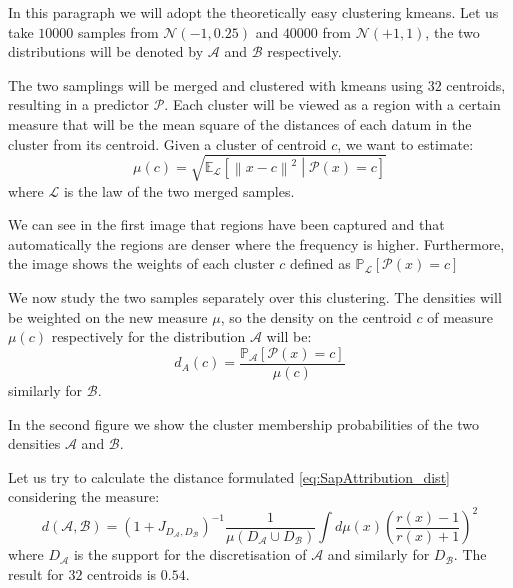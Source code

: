 \begin{toReview}
\begin{exempli_gratia}
	In this paragraph we will adopt the theoretically easy clustering \gls{kmeans}. Let us take $\num{10000}$ samples from $\mathcal{N}(-1,0.25)$ and $\num{40000}$ from $\mathcal{N}(+1,1)$, the two distributions will be denoted by $\mathcal{A}$ and $\mathcal{B}$ respectively.

	\noindent The two samplings will be merged and clustered with \gls{kmeans} using $32$ centroids, resulting in a predictor $\mathcal{P}$. Each cluster will be viewed as a region with a certain measure that will be the mean square of the distances of each datum in the cluster from its centroid. Given a cluster of centroid $c$, we want to estimate:
	\[
	\mu(c)=\sqrt{\mathbb{E}_\mathcal{L}\left[\left\|x-c\right\|^2\middle|\mathcal{P}\left(x\right)=c\right]}
	\]
	where $\mathcal{L}$ is the law of the two merged samples.

	\noindent We can see in the first image that regions have been captured and that automatically the regions are denser where the frequency is higher. Furthermore, the image shows the weights of each cluster $c$ defined as  $\mathbb{P}_\mathcal{L}\left[\mathcal{P}(x)=c\right]$

	\noindent We now study the two samples separately over this clustering. The densities will be weighted on the new measure $\mu$, so the density on the centroid $c$ of measure $\mu(c)$ respectively for the distribution $\mathcal{A}$ will be:
	\[
	d_A(c)=\frac{\mathbb{P}_{\mathcal{A}}\left[\mathcal{P}(x)=c\right]}{\mu(c)}
	\]
	similarly for $\mathcal{B}$.

	\noindent In the second figure we show the cluster membership probabilities of the two densities $\mathcal{A}$ and $\mathcal{B}$.

	\noindent Let us try to calculate the distance formulated \cref{eq:SapAttribution_dist} considering the measure:
	\[
	d(\mathcal{A},\mathcal{B})=(1+J_{D_\mathcal{A},D_\mathcal{B}})^{-1}\frac{1}{\mu(D_\mathcal{A}\cup D_\mathcal{B})}\int d\mu(x) \left(\frac{r(x)-1}{r(x)+1}\right)^2
	\]
	where $D_{\mathcal{A}}$ is the support for the discretisation of ${\mathcal{A}}$ and similarly for $D_{\mathcal{B}}$. The result for $32$ centroids is $0.54$.


\end{exempli_gratia}
\end{toReview}
